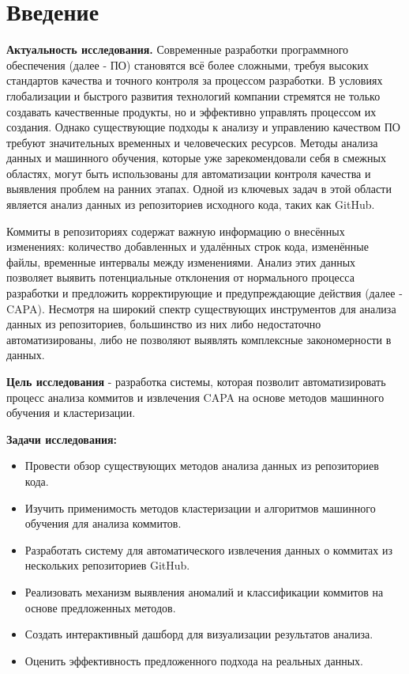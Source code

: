 \chapter*{Введение} %
\setlength\parindent{1.5em}

\par \textbf{Актуальность исследования.} Современные разработки программного обеспечения (далее - ПО) становятся всё более сложными, требуя высоких стандартов качества и точного контроля за процессом разработки. В условиях глобализации и быстрого развития технологий компании стремятся не только создавать качественные продукты, но и эффективно управлять процессом их создания. Однако существующие подходы к анализу и управлению качеством ПО требуют значительных временных и человеческих ресурсов. Методы анализа данных и машинного обучения, которые уже зарекомендовали себя в смежных областях, могут быть использованы для автоматизации контроля качества и выявления проблем на ранних этапах. Одной из ключевых задач в этой области является анализ данных из репозиториев исходного кода, таких как GitHub.

Коммиты в репозиториях содержат важную информацию о внесённых изменениях: количество добавленных и удалённых строк кода, изменённые файлы, временные интервалы между изменениями. Анализ этих данных позволяет выявить потенциальные отклонения от нормального процесса разработки и предложить корректирующие и предупреждающие действия (далее - CAPA). Несмотря на широкий спектр существующих инструментов для анализа данных из репозиториев, большинство из них либо недостаточно автоматизированы, либо не позволяют выявлять комплексные закономерности в данных.

\textbf{Цель исследования} - разработка системы, которая позволит автоматизировать процесс анализа коммитов и извлечения CAPA на основе методов машинного обучения и кластеризации.

\textbf{Задачи исследования:}
\begin{itemize}
	\item Провести обзор существующих методов анализа данных из репозиториев кода.
	\item Изучить применимость методов кластеризации и алгоритмов машинного обучения для анализа коммитов.
	\item Разработать систему для автоматического извлечения данных о коммитах из нескольких репозиториев GitHub.
	\item Реализовать механизм выявления аномалий и классификации коммитов на основе предложенных методов.
	\item Создать интерактивный дашборд для визуализации результатов анализа.
	\item Оценить эффективность предложенного подхода на реальных данных.
\end{itemize}

